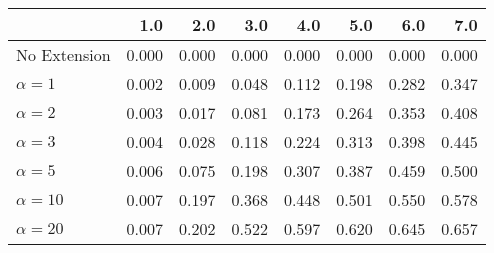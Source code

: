 \begin{tabular}{lrrrrrrr}
\toprule
{} &   1.0 &   2.0 &   3.0 &   4.0 &   5.0 &   6.0 &   7.0 \\
\midrule
No Extension  & 0.000 & 0.000 & 0.000 & 0.000 & 0.000 & 0.000 & 0.000 \\
$\alpha = 1$  & 0.002 & 0.009 & 0.048 & 0.112 & 0.198 & 0.282 & 0.347 \\
$\alpha = 2$  & 0.003 & 0.017 & 0.081 & 0.173 & 0.264 & 0.353 & 0.408 \\
$\alpha = 3$  & 0.004 & 0.028 & 0.118 & 0.224 & 0.313 & 0.398 & 0.445 \\
$\alpha = 5$  & 0.006 & 0.075 & 0.198 & 0.307 & 0.387 & 0.459 & 0.500 \\
$\alpha = 10$ & 0.007 & 0.197 & 0.368 & 0.448 & 0.501 & 0.550 & 0.578 \\
$\alpha = 20$ & 0.007 & 0.202 & 0.522 & 0.597 & 0.620 & 0.645 & 0.657 \\
\bottomrule
\end{tabular}
